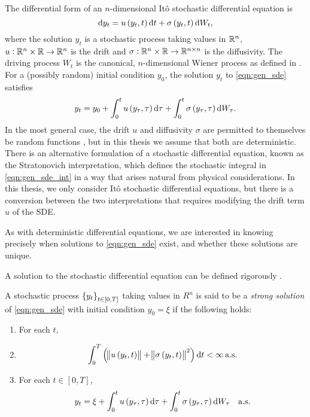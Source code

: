 The differential form of an \(n\)-dimensional It\^o stochastic differential equation is
\begin{equation}
	\dif y_t = u\left(y_t, t\right)\dif t + \sigma\left(y_t, t\right)\dif W_t,
	\label{eqn:gen_sde}
\end{equation}
where the solution \(y_t\) is a stochastic process taking values in \(\mathbb{R}^n\), \(u: \mathbb{R}^n \times \mathbb{R} \to \mathbb{R}^n\) is the drift and \(\sigma: \mathbb{R}^n \times \mathbb{R} \to \mathbb{R}^{n\times n}\) is the diffusivity.
The driving process \(W_t\) is the canonical, \(n\)-dimensional Wiener process as defined in .
For a (possibly random) initial condition \(y_0\), the solution \(y_t\) to \eqref{eqn:gen_sde} satisfies
\begin{equation}
	y_t = y_0 + \int_0^t{u\left(y_\tau, \tau\right)\dif\tau} + \int_0^t{\sigma\left(y_\tau, \tau\right)\dif W_\tau}.
	\label{eqn:gen_sde_int}
\end{equation}
In the most general case, the drift \(u\) and diffusivity \(\sigma\) are permitted to themselves be random functions \cite{KallianpurSundar_2014_StochasticAnalysisDiffusion}, but in this thesis we assume that both are deterministic.
There is an alternative formulation of a stochastic differential equation, known as the Stratonovich interpretation, which defines the stochastic integral in \eqref{eqn:gen_sde_int} in a way that arises natural from physical considerations.
In this thesis, we only consider It\^o stochastic differential equations, but there is a conversion between the two interpretations that requires modifying the drift term \(u\) of the SDE.

As with deterministic differential equations, we are interested in knowing precisely when solutions to \eqref{eqn:gen_sde} exist, and whether these solutions are unique.

A solution to the stochastic differential equation can be defined rigorously \cite{KallianpurSundar_2014_StochasticAnalysisDiffusion}.
\begin{definition}
	A stochastic process \(\set{y_t}_{t \in [0,T]}\) taking values in \(R^n\) is said to be a \emph{strong solution} of \eqref{eqn:gen_sde} with initial condition \(y_0 = \xi\) if the following holds:
	\begin{enumerate}
		\item For each \(t\),
		\item
		      \[
			      \int_0^T{\left(\norm{u\left(y_t, t\right)} + \norm{\sigma\left(y_t, t\right)}^2\right)\dif t} < \infty \alsu
		      \]

		\item For each \(t \in [0,T]\),
		      \[
			      y_t = \xi + \int_0^t{u\left(y_\tau, \tau\right)\dif\tau} + \int_0^t{\sigma\left(y_\tau, \tau\right)\dif W_\tau} \quad \text{a.s.}
		      \]
	\end{enumerate}
\end{definition}

